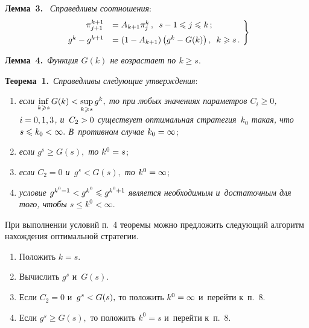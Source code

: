 \begin{multicols}{2}
\smallskip

\noindent
\textbf{Лемма~3.}\ 
\textit{
Справедливы соотношения}:
\begin{equation}
\left.
\begin{array}{rl}
\!\! \pi_{j+1}^{k+1}&=A_{k+1}\pi_{j}^{k}\,,\enskip s-1\leqslant j\leqslant k\,;\\[6pt]
\!\!g^k-g^{k+1}&=(1-A_{k+1})\left(g^k-G(k)\right),\enskip k\geqslant s\,.
\end{array}\!
\right\}\!
\label{8}
\end{equation}


\noindent
\textbf{Лемма~4.}\ 
\textit{Функция $G(k)$ не возрастает по $k\geqslant s.$}

\smallskip

\noindent
\textbf{Теорема~1.}\ 
\textit{Справедливы следующие утверждения}:
\begin{enumerate}[(1)]
\item \textit{если $\inf\limits_{k\geqslant s}G(k)\hm<\sup\limits_{k\geqslant s}g^k,$ то при любых
значениях параметров $C_i\geqslant 0$, $i\hm=0,1,3$, и~$C_2\hm>0$ существует
оптимальная стратегия~$k_0$ такая, что $s\hm\leqslant k_0\hm<\infty.$ 
В~противном случае $k_0\hm=\infty$};

\item \textit{если $g^s\geqslant G(s),$ то $k^0\hm=s$};

\item \textit{если $C_2=0$ и~$g^s<G(s),$ то $k^0\hm=\infty$};

\item \textit{условие $g^{k^0-1}\hm<g^{k^0}\hm\leqslant g^{k^0+1}$ является необходимым 
и~достаточным для того, чтобы $s\leqslant k^0<\infty$}.
\end{enumerate}

\smallskip

При выполнении условий п.~4 теоремы можно предложить
следующий алгоритм нахождения оптимальной стратегии.
\begin{enumerate}[1.]
\item Положить $k=s.$

\item Вычислить $g^s$ и~$G(s).$

\item Если $C_2=0$ и~$g^s\hm<G(s),$ то положить $k^0\hm=\infty$ и~перейти к~п.~8.

\item Если $g^s\geqslant G(s),$ то положить $k^0=s$ и~перейти к~п.~8.


\end{enumerate}
\end{multicols}
